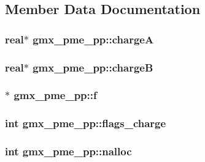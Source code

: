 \subsection{\-Member \-Data \-Documentation}
\hypertarget{structgmx__pme__pp_ac8202a8f1a26579ee141d6ecb80e35a6}{
\subsubsection[{charge\-A}]{\setlength{\rightskip}{0pt plus 5cm}real$\ast$ {\bf gmx\-\_\-pme\-\_\-pp\-::charge\-A}}}\label{structgmx__pme__pp_ac8202a8f1a26579ee141d6ecb80e35a6}
\hypertarget{structgmx__pme__pp_a378c9b6ed40e9091972501eee6b521d4}{
\subsubsection[{charge\-B}]{\setlength{\rightskip}{0pt plus 5cm}real$\ast$ {\bf gmx\-\_\-pme\-\_\-pp\-::charge\-B}}}\label{structgmx__pme__pp_a378c9b6ed40e9091972501eee6b521d4}
\hypertarget{structgmx__pme__pp_ab340cc7c9907fb6aad9d430a73193603}{
\subsubsection[{f}]{$\ast$ {\bf gmx\-\_\-pme\-\_\-pp\-::f}}}\label{structgmx__pme__pp_ab340cc7c9907fb6aad9d430a73193603}
\hypertarget{structgmx__pme__pp_a13e02cc138161f3d52c5ca7fa4af5280}{
\subsubsection[{flags\-\_\-charge}]{\setlength{\rightskip}{0pt plus 5cm}int {\bf gmx\-\_\-pme\-\_\-pp\-::flags\-\_\-charge}}}\label{structgmx__pme__pp_a13e02cc138161f3d52c5ca7fa4af5280}
\hypertarget{structgmx__pme__pp_aa7c335c4f7c7391f42ef7ac9c207c434}{
\subsubsection[{nalloc}]{\setlength{\rightskip}{0pt plus 5cm}int {\bf gmx\-\_\-pme\-\_\-pp\-::nalloc}}}\label{structgmx__pme__pp_aa7c335c4f7c7391f42ef7ac9c207c434}

